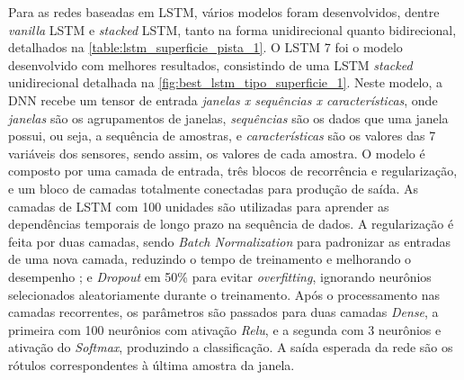 Para as redes baseadas em LSTM, vários modelos foram desenvolvidos, dentre \textit{vanilla} LSTM e \textit{stacked} LSTM, tanto na forma unidirecional quanto bidirecional, detalhados na \autoref{table:lstm_superficie_pista_1}. O LSTM 7 foi o modelo desenvolvido com melhores resultados, consistindo de uma LSTM \textit{stacked} unidirecional detalhada na \autoref{fig:best_lstm_tipo_superficie_1}. Neste modelo, a DNN recebe um tensor de entrada \emph{janelas x sequências x características}, onde \emph{janelas} são os agrupamentos de janelas, \emph{sequências} são os dados que uma janela possui, ou seja, a sequência de amostras, e \emph{características} são os valores das 7 variáveis dos sensores, sendo assim, os valores de cada amostra. O modelo é composto por uma camada de entrada, três blocos de recorrência e regularização, e um bloco de camadas totalmente conectadas para produção de saída. As camadas de LSTM com 100 unidades são utilizadas para aprender as dependências temporais de longo prazo na sequência de dados. A regularização é feita por duas camadas, sendo \textit{Batch Normalization} para padronizar as entradas de uma nova camada, reduzindo o tempo de treinamento e melhorando o desempenho \cite{Zebin2018}; e \textit{Dropout} em 50\% para evitar \textit{overfitting}, ignorando neurônios selecionados aleatoriamente durante o treinamento. Após o processamento nas camadas recorrentes, os parâmetros são passados para duas camadas \textit{Dense}, a primeira com 100 neurônios com ativação \textit{Relu}, e a segunda com 3 neurônios e ativação do \textit{Softmax}, produzindo a classificação. A saída esperada da rede são os rótulos correspondentes à última amostra da janela.

